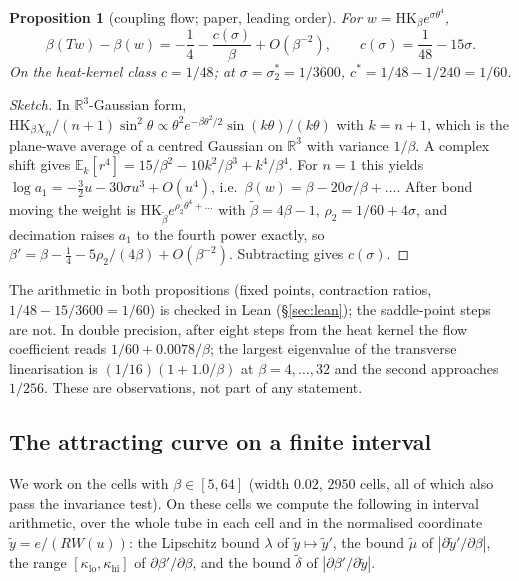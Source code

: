 \documentclass[11pt,a4paper]{article}
\newtheorem{proposition}[theorem]{Proposition}
\theoremstyle{definition}
\theoremstyle{remark}
\newcommand{\R}{\mathbb{R}}
\newcommand{\HK}{\mathrm{HK}}
\begin{document}
\begin{proposition}[coupling flow; paper, leading order]\label{prop:cstar}
For $w=\HK_\beta e^{\sigma\theta^4}$,
\[
\beta(Tw)-\beta(w)=-\frac14-\frac{c(\sigma)}{\beta}+O(\beta^{-2}),\qquad c(\sigma)=\frac1{48}-15\sigma .
\]
On the heat-kernel class $c=1/48$; at $\sigma=\sigma_2^*=1/3600$, $c^*=1/48-1/240=1/60$.
\end{proposition}
\begin{proof}[Sketch]
In $\R^3$-Gaussian form, $\HK_\beta\chi_n/(n+1)\sin^2\theta\propto\theta^2e^{-\beta\theta^2/2}\sin(k\theta)/(k\theta)$ with $k=n+1$, which is the plane-wave average of a centred Gaussian on $\R^3$ with variance $1/\beta$.
A complex shift gives $\mathbb{E}_k[r^4]=15/\beta^2-10k^2/\beta^3+k^4/\beta^4$.
For $n=1$ this yields $\log a_1=-\tfrac32u-30\sigma u^3+O(u^4)$, i.e.\ $\beta(w)=\beta-20\sigma/\beta+\dots$.
After bond moving the weight is $\HK_{\tilde\beta}e^{\rho_2\theta^4+\dots}$ with $\tilde\beta=4\beta-1$, $\rho_2=1/60+4\sigma$, and decimation raises $a_1$ to the fourth power exactly, so $\beta'=\beta-\tfrac14-5\rho_2/(4\beta)+O(\beta^{-2})$.
Subtracting gives $c(\sigma)$.
\end{proof}
The arithmetic in both propositions (fixed points, contraction ratios, $1/48-15/3600=1/60$) is checked in Lean (\S\ref{sec:lean}); the saddle-point steps are not.
In double precision, after eight steps from the heat kernel the flow coefficient reads $1/60+0.0078/\beta$; the largest eigenvalue of the transverse linearisation is $(1/16)(1+1.0/\beta)$ at $\beta=4,\dots,32$ and the second approaches $1/256$.
These are observations, not part of any statement.

\subsection{The attracting curve on a finite interval}
We work on the cells with $\beta\in[5,64]$ (width $0.02$, $2950$ cells, all of which also pass the invariance test).
On these cells we compute the following in interval arithmetic, over the whole tube in each cell and in the normalised coordinate $\tilde y=e/(RW(u))$: the Lipschitz bound $\lambda$ of $\tilde y\mapsto\tilde y'$, the bound $\tilde\mu$ of $|\partial\tilde y'/\partial\beta|$, the range $[\kappa_{\mathrm{lo}},\kappa_{\mathrm{hi}}]$ of $\partial\beta'/\partial\beta$, and the bound $\tilde\delta$ of $|\partial\beta'/\partial\tilde y|$.
\end{document}
